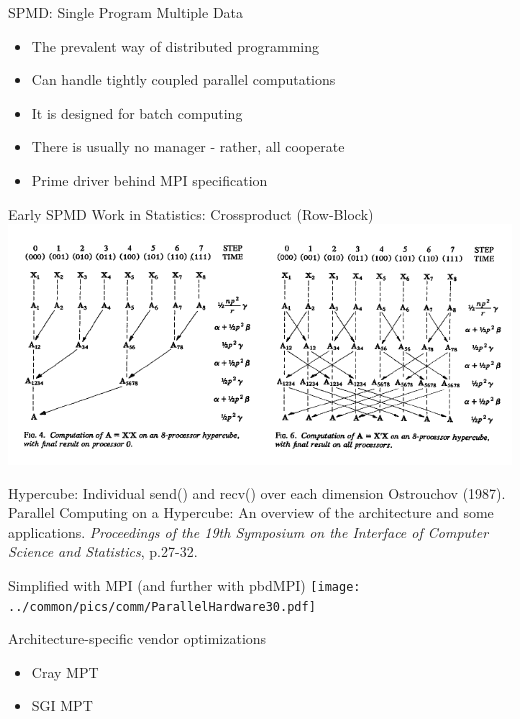 \begin{frame}{SPMD: Single Program Multiple Data}
  \begin{block}{}
    \begin{itemize}
    \item The prevalent way of distributed programming
    \item Can handle tightly coupled parallel computations
    \item It is designed for batch computing
    \item There is usually no manager - rather, all cooperate
    \item Prime driver behind MPI specification
    \end{itemize}
  \end{block}
\end{frame}

\begin{frame}{Early SPMD Work in Statistics: Crossproduct (Row-Block)}
  \includegraphics[width=\textwidth]
  {../common/pics/comm/Crossprod1987.png} \\
  \begin{block}{Hypercube: Individual send() and recv() over each dimension}
    {\scriptsize Ostrouchov (1987). Parallel Computing on a
      Hypercube: An overview of the architecture and some
      applications. {\em Proceedings of the 19th Symposium on the
        Interface of Computer Science and Statistics}, p.27-32.}
  \end{block}
\end{frame}

\begin{frame}{Simplified with MPI (and further with pbdMPI)}
  \texttt{[image: ../common/pics/comm/ParallelHardware30.pdf]}
  \vspace{-1ex}
  \begin{block}{Architecture-specific vendor optimizations}
    \begin{itemize}
    \item \small Cray MPT
    \item \small SGI MPT
    \end{itemize}
  \end{block}
\end{frame}

